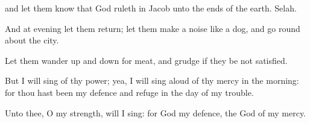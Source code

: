 {{} and let them
know that
God
ruleth in
Jacob unto the
ends of the
earth.
Selah.
\par }{\Q {}And at
evening let them
return;
{} let them make a
noise like a
dog, and go round
about the
city.
\par }{\Q {}Let them wander up and
down for
meat, and
grudge if they be not
satisfied.
\par }{\Q {}But I will
sing of thy
power; yea, I will sing
aloud of thy
mercy in the
morning: for thou hast been my
defence and
refuge in the
day of my
trouble.
\par }{\Q {}Unto thee, O my
strength, will I
sing: for
God
{} my
defence,
{} the
God of my
mercy.

}
